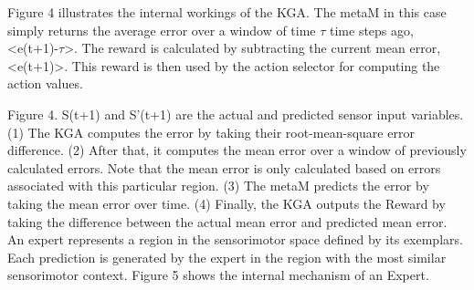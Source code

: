 Figure 4 illustrates the internal workings of the KGA. The metaM in this case simply returns the average error over a window of time \(\tau\) time steps ago, <e(t+1)-\(\tau\)>. The reward is calculated by subtracting the current mean error, <e(t+1)>. This reward is then used by the action selector for computing the action values. 

Figure 4.	S(t+1) and S'(t+1) are the actual and predicted sensor input variables. (1) The KGA computes the error by taking their root-mean-square error difference. (2) After that, it computes the mean error over a window of previously calculated errors. Note that the mean error is only calculated based on errors associated with this particular region. (3) The metaM predicts the error by taking the mean error over time. (4) Finally, the KGA outputs the Reward by taking the difference between the actual mean error and predicted mean error.
An expert represents a region in the sensorimotor space defined by its exemplars. Each prediction is generated by the expert in the region with the most similar sensorimotor context. Figure 5 shows the internal mechanism of an Expert.

